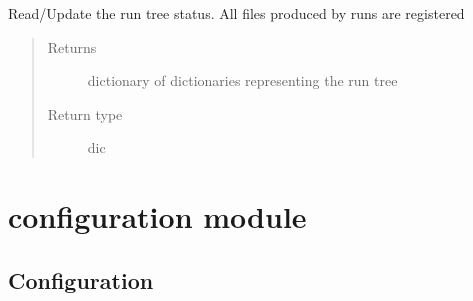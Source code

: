 \documentclass[letterpaper,10pt,english]{sphinxmanual}
\begin{document}
\begin{fulllineitems}
\begin{fulllineitems}
\begin{quote}
\begin{description}
\end{description}\end{quote}

\end{fulllineitems}


\begin{fulllineitems}
\label{\detokenize{api/initobjects:status.Status.update_run_status}}
\sphinxAtStartPar
Read/Update the run tree status. All files produced by runs are
registered
\begin{quote}\begin{description}
\item[{Returns}] \leavevmode
\sphinxAtStartPar
{} \textendash{} dictionary of dictionaries representing the run tree

\item[{Return type}] \leavevmode
\sphinxAtStartPar
dic

\end{description}\end{quote}

\end{fulllineitems}


\end{fulllineitems}



\section{configuration module}
\label{\detokenize{api/initobjects:configuration-module}}

\subsection{Configuration}
\label{\detokenize{api/initobjects:configuration}}\label{\detokenize{api/initobjects:confob}}
\end{document}
